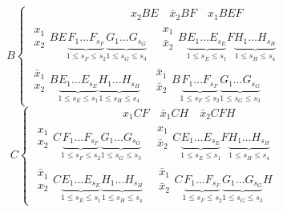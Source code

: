 \documentclass[12pt,a4paper,oneside,fleqn,leqno]{article}
\theoremstyle{definition}
\begin{document}
			$$
			B\begin{cases}
\qquad\qquad\qquad\qquad\quad x_2BE\quad \bar{x}_2BF\quad x_1BEF\\
\begin{matrix}x_1\\x_2\end{matrix} BE\underbrace{F_1\ldots F_{s_F}}_{1 \leqslant s_F \leqslant s_2}\underbrace{G_1\ldots G_{s_G}}_{1 \leqslant s_G \leqslant s_3} \quad
 \begin{matrix}x_1\\\bar{x}_2\end{matrix} B\underbrace{E_1\ldots E_{s_E}}_{1 \leqslant s_E \leqslant s_1}F\underbrace{H_1\ldots H_{s_H}}_{1 \leqslant s_H \leqslant s_4} \\
 \begin{matrix}\bar{x}_1\\x_2\end{matrix} B\underbrace{E_1\ldots E_{s_E}}_{1 \leqslant s_E \leqslant s_1}\underbrace{H_1\ldots H_{s_H}}_{1 \leqslant s_H \leqslant s_4} \quad
\begin{matrix}\bar{x}_1\\\bar{x}_2\end{matrix} B\underbrace{F_1\ldots F_{s_F}}_{1 \leqslant s_F \leqslant s_2}\underbrace{G_1\ldots G_{s_G}}_{1 \leqslant s_G \leqslant s_3}
			\end{cases}
			$$
			$$
			C\begin{cases}
\qquad\qquad\qquad\qquad x_1CF\quad \bar{x}_1CH\quad \bar{x}_2CFH\\
\begin{matrix}x_1\\x_2\end{matrix} C\underbrace{F_1\ldots F_{s_F}}_{1 \leqslant s_F \leqslant s_2}\underbrace{G_1\ldots G_{s_G}}_{1 \leqslant s_G \leqslant s_3} \quad
 \begin{matrix}x_1\\\bar{x}_2\end{matrix} C\underbrace{E_1\ldots E_{s_E}}_{1 \leqslant s_E \leqslant s_1}F\underbrace{H_1\ldots H_{s_H}}_{1 \leqslant s_H \leqslant s_4} \\
 \begin{matrix}\bar{x}_1\\x_2\end{matrix} C\underbrace{E_1\ldots E_{s_E}}_{1 \leqslant s_E \leqslant s_1}\underbrace{H_1\ldots H_{s_H}}_{1 \leqslant s_H \leqslant s_4} \quad
\begin{matrix}\bar{x}_1\\\bar{x}_2\end{matrix} C\underbrace{F_1\ldots F_{s_F}}_{1 \leqslant s_F \leqslant s_2}\underbrace{G_1\ldots G_{s_G}}_{1 \leqslant s_G \leqslant s_3}H
			\end{cases}
			$$
\end{document}
